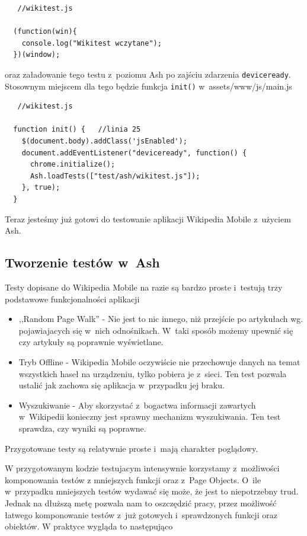 \documentclass[brudnopis]{xmgr}
\begin{document}
\begin{lstlisting}
   //wikitest.js

  (function(win){  
    console.log("Wikitest wczytane");
  })(window);
\end{lstlisting}

oraz załadowanie tego testu z~poziomu Ash po zajściu zdarzenia \texttt{deviceready}. Stosownym miejscem dla tego będzie funkcja \texttt{init()} w~assets/www/js/main.js

\begin{lstlisting}
   //wikitest.js

  function init() {   //linia 25
    $(document.body).addClass('jsEnabled');
    document.addEventListener("deviceready", function() {
      chrome.initialize(); 
      Ash.loadTests(["test/ash/wikitest.js"]);
    }, true);
  }
\end{lstlisting}

Teraz jesteśmy już gotowi do testowanie aplikacji Wikipedia Mobile z~użyciem Ash.

\subsection{Tworzenie testów w~Ash}

Testy dopisane do Wikipedia Mobile na razie są bardzo proste i~testują trzy podstawowe funkcjonalności aplikacji 

\begin{itemize}
  \item ,,Random Page Walk'' - Nie jest to nic innego, niż przejście po artykułach wg. pojawiajacych się w~nich odnośnikach. W~taki sposób możemy upewnić się czy artykuły są poprawnie wyświetlane.
  \item Tryb Offline - Wikipedia Mobile oczywiście nie przechowuje danych na temat wszystkich haseł na urządzeniu, tylko pobiera je z~sieci. Ten test pozwala ustalić jak zachowa się aplikacja w~przypadku jej braku.
  \item Wyszukiwanie - Aby skorzystać z~bogactwa informacji zawartych w~Wikipedii konieczny jest sprawny mechanizm wyszukiwania. Ten test sprawdza, czy wyniki są poprawne.  
\end{itemize}

Przygotowane testy są relatywnie proste i~mają charakter poglądowy. 

W przygotowanym kodzie testujacym intensywnie korzystamy z~możliwości komponowania testów z mniejszych funkcji oraz z~Page Objects. O~ile w~przypadku mniejszych testów wydawać się może, że jest to niepotrzebny trud. Jednak na dłuższą metę pozwala nam to oszczędzić pracy, przez możliwość łatwego komponowanie testów z~już gotowych i~sprawdzonych funkcji oraz obiektów. W praktyce wygląda to następująco
\end{document}
